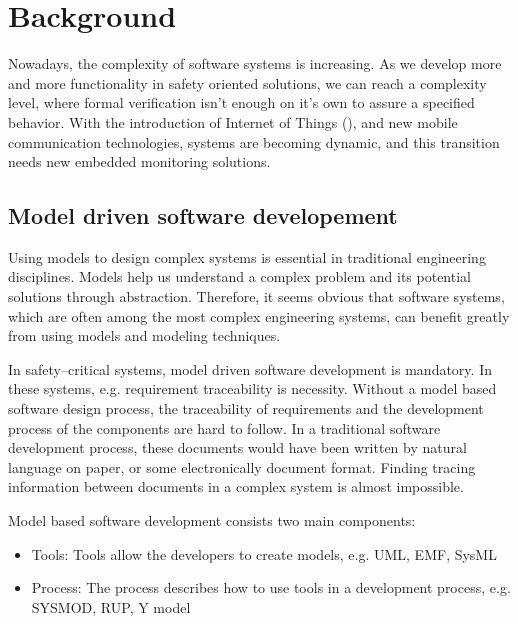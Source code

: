 \chapter{Background}
\label{chap:background}

Nowadays, the complexity of software systems is increasing. As we develop more and more functionality in safety oriented solutions, we can reach a complexity level, where formal verification isn't enough on it's own to assure a specified behavior. With the introduction of Internet of Things (\iot), and new mobile communication technologies, systems are becoming dynamic, and this transition needs new embedded monitoring solutions.

\section{Model driven software developement}

Using models to design complex systems is essential in traditional engineering disciplines. Models help us understand a complex problem and its potential solutions through abstraction. Therefore, it seems obvious that software systems, which are often among the most complex engineering systems, can benefit greatly from using models and modeling techniques. \citep{pastor2008model}

In safety--critical systems, model driven software development is mandatory. In these systems, e.g. requirement traceability is necessity. Without a model based software design process, the traceability of requirements and the development process of the components are hard to follow. In a traditional software development process, these documents would have been written by natural language on paper, or some electronically document format. Finding tracing information between documents in a complex system is almost impossible.

Model based software development consists two main components:
\begin{itemize}
	\item Tools: Tools allow the developers to create models, e.g. UML, EMF, SysML
	\item Process: The process describes how to use tools in a development process, e.g. SYSMOD, RUP, Y model
\end{itemize}


